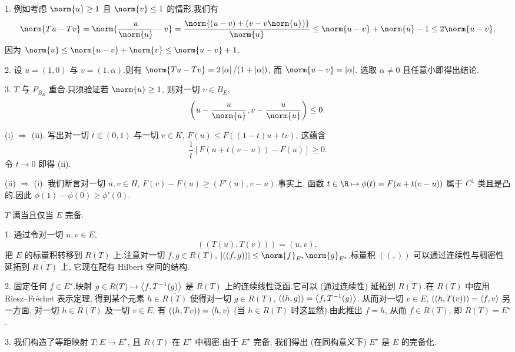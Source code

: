 
1. 例如考虑 $\norm{u}\ge1$ 且 $\norm{v}\le1$ 的情形.我们有
\begin{equation*}
\norm{Tu-Tv}=\norm{\frac{u}{\norm{u}}-v}=\frac{\norm{(u-v)+(v-v\norm{u})}}{\norm{u}}
\le\norm{u-v}+\norm{u}-1\le2\norm{u-v},
\end{equation*}
因为 $\norm{u}\le\norm{u-v}+\norm{v}\le\norm{u-v}+1$.

2. 设 $u=(1,0)$ 与 $v=(1,\alpha)$.则有
$\norm{Tu-Tv}=2\abs{\alpha}/(1+\abs{\alpha})$, 而 $\norm{u-v}=\abs{\alpha}$.
选取 $\alpha\ne0$ 且任意小即得出结论.

3. $T$ 与 $P_{B_E}$ 重合.只须验证若 $\norm{u}\ge1$, 则对一切 $v\in B_E$,
\begin{equation*}
\left(u-\frac{u}{\norm{u}},v-\frac{u}{\norm{u}}\right)\le0.
\end{equation*}


(i) $\Rightarrow$ (ii). 写出对一切 $t\in(0,1)$ 与一切 $v\in K$,
$F(u)\le F((1-t)u+tv)$, 这蕴含
\begin{equation*}
\frac1t[F(u+t(v-u))-F(u)]\ge0.
\end{equation*}
令 $t\to0$ 即得 (ii).

(ii) $\Rightarrow$ (i). 我们断言对一切 $u,v\in H$,
$F(v)-F(u)\ge(F'(u),v-u)$.事实上, 函数 $t\in\R\mapsto\phi(t)=F(u+t(v-u))$
属于 $C^1$ 类且是凸的.因此 $\phi(1)-\phi(0)\ge\phi'(0)$.


$T$ 满当且仅当 $E$ 完备.

1. 通过令对一切 $u,v\in E$,
\begin{equation*}
((T(u),T(v)))=(u,v),
\end{equation*}
把 $E$ 的标量积转移到 $R(T)$ 上.注意对一切 $f,g\in R(T)$,
$\abs{((f,g))}\le\norm{f}_{E^\star}\norm{g}_{E^\star}$.标量积 $(( , ))$
可以通过连续性与稠密性延拓到 $\overline{R(T)}$ 上, 它现在配有 Hilbert
空间的结构.

2. 固定任何 $f\in E^\star$.映射 $g\in R(T)\mapsto\left\langle f,T^{-1}(g)\right\rangle$ 是
$R(T)$ 上的连续线性泛函.它可以 (通过连续性) 延拓到 $\overline{R(T)}$.在
$\overline{R(T)}$ 中应用 Riesz--Fréchet 表示定理, 得到某个元素
$h\in\overline{R(T)}$ 使得对一切 $g\in R(T)$, $((h,g))=\left\langle f,T^{-1}(g)\right\rangle$.
从而对一切 $v\in E$, $((h,T(v)))=\left\langle f,v\right\rangle$.另一方面, 对一切
$h\in\overline{R(T)}$ 及一切 $v\in E$, 有 $((h,Tv))=\left\langle h,v\right\rangle$ (当
$h\in R(T)$ 时这显然).由此推出 $f=h$, 从而 $f\in R(T)$, 即 $R(T)=E^\star$.

3. 我们构造了等距映射 $T:E\to E^\star$, 且 $R(T)$ 在 $E^\star$ 中稠密.由于
$E^\star$ 完备, 我们得出 (在同构意义下) $E^\star$ 是 $E$ 的完备化.

